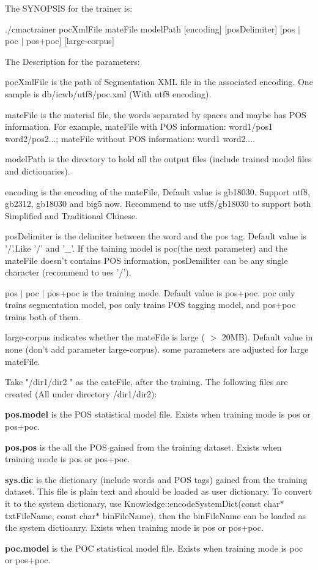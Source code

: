 The SYNOPSIS for the trainer is: \par
 ./cmactrainer pocXmlFile mateFile modelPath [encoding] [posDelimiter] [pos $|$ poc $|$ pos+poc] [large-\/corpus] \par


\par
The Description for the parameters: 
\begin{DoxyItemize}
\item pocXmlFile is the path of Segmentation XML file in the associated encoding. One sample is db/icwb/utf8/poc.xml (With utf8 encoding).  
\item mateFile is the material file, the words separated by spaces and maybe has POS information. For example, mateFile with POS information: word1/pos1 word2/pos2...; mateFile without POS information: word1 word2.... 
\item modelPath is the directory to hold all the output files (include trained model files and dictionaries). 
\item encoding is the encoding of the mateFile, Default value is gb18030. Support utf8, gb2312, gb18030 and big5 now. Recommend to use utf8/gb18030 to support both Simplified and Traditional Chinese. 
\item posDelimiter is the delimiter between the word and the pos tag. Default value is '/'.Like '/' and '\_\-'. If the taining model is poc(the next parameter) and the mateFile doesn't contains POS information, posDemiliter can be any single character (recommend to ues '/'). 
\item pos $|$ poc $|$ pos+poc is the training mode. Default value is pos+poc. poc only trains segmentation model, pos only trains POS tagging model, and pos+poc trains both of them. 
\item large-\/corpus indicates whether the mateFile is large ( $>$ 20MB). Default value in none (don't add parameter large-\/corpus). some parameters are adjusted for large mateFile. 
\end{DoxyItemize}

Take "/dir1/dir2 " as the cateFile, after the training. The following files are created (All under directory /dir1/dir2): 
\begin{DoxyEnumerate}
\item {\bfseries pos.model} is the POS statistical model file. Exists when training mode is pos or pos+poc. 
\item {\bfseries pos.pos} is the all the POS gained from the training dataset. Exists when training mode is pos or pos+poc. 
\item {\bfseries sys.dic} is the dictionary (include words and POS tags) gained from the training dataset. This file is plain text and should be loaded as user dictionary. To convert it to the system dictionary, use Knowledge::encodeSystemDict(const char$\ast$ txtFileName, const char$\ast$ binFileName), then the binFileName can be loaded as the system dictioanry. Exists when training mode is pos or pos+poc. 
\item {\bfseries poc.model} is the POC statistical model file. Exists when training mode is poc or pos+poc. 
\end{DoxyEnumerate}


